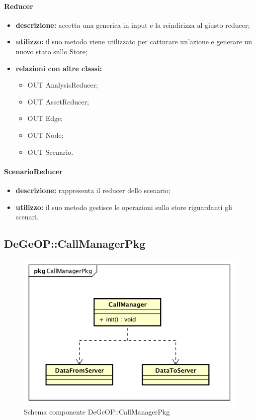 \paragraph{Reducer}
\begin{itemize}
	\item \textbf{descrizione:} accetta una  generica in input e la reindirizza al giusto reducer;
	\item \textbf{utilizzo:} il suo metodo viene utilizzato per catturare un'azione e generare un nuovo stato sullo Store;
	\item \textbf{relazioni con altre classi:} 
	\begin{itemize}
		\item OUT AnalysisReducer;
		\item OUT AssetReducer;
		\item OUT Edge;
		\item OUT Node;
		\item OUT Scenario.
	\end{itemize}
\end{itemize}
\paragraph{ScenarioReducer}
\begin{itemize}
	\item \textbf{descrizione:} rappresenta il reducer dello scenario;
	\item \textbf{utilizzo:} il suo metodo gestisce le operazioni sullo store riguardanti gli scenari.
\end{itemize}
\newpage
\subsection{DeGeOP::CallManagerPkg}
\label{pkg::CallManagerPkg}
\begin{figure}[H]
	\centering
	\includegraphics[width=\textwidth]{img/PkgDiagram/CallManagerPkg.png}
	\caption{Schema componente DeGeOP::CallManagerPkg}
\end{figure}
